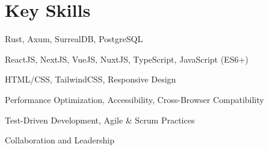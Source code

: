 \section*{Key Skills}
\begin{highlights}
    \item Rust, Axum, SurrealDB, PostgreSQL
    \item ReactJS, NextJS, VueJS, NuxtJS, TypeScript, JavaScript (ES6+)
    \item HTML/CSS, TailwindCSS, Responsive Design
    \item Performance Optimization, Accessibility, Cross-Browser Compatibility
    \item Test-Driven Development, Agile \& Scrum Practices
    \item Collaboration and Leadership
\end{highlights}
